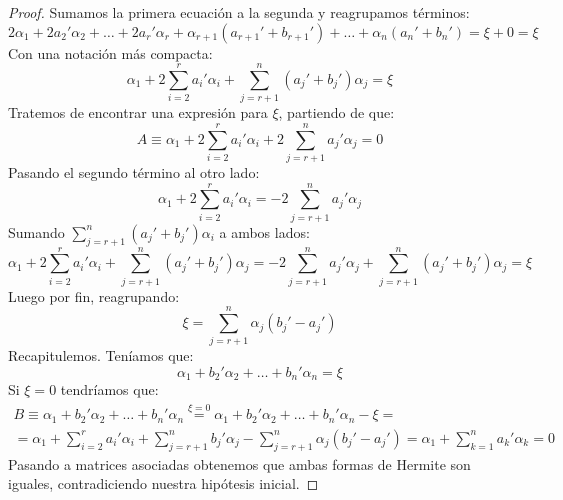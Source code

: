 \begin{proof}
	Sumamos la primera ecuación a la segunda y reagrupamos términos:
	\[2\alpha_1+2a_2'\alpha_2+\dots+2a_r'\alpha_r+\alpha_{r+1}(a_{r+1}'+b_{r+1}')+\dots+\alpha_n(a_n'+b_n')=\xi+0=\xi\]
	Con una notación más compacta:
	\[\alpha_1+2\sum_{i=2}^{r}a_i'\alpha_i+\sum_{j=r+1}^{n}(a_j'+b_j')\alpha_j=\xi\]
	Tratemos de encontrar una expresión para $\xi$, partiendo de que:
	\[A\equiv \alpha_1+2\sum_{i=2}^{r}a_i'\alpha_i+2\sum_{j=r+1}^{n}a_j'\alpha_j=0\]
	Pasando el segundo término al otro lado:
	\[\alpha_1+2\sum_{i=2}^{r}a_i'\alpha_i=-2\sum_{j=r+1}^{n}a_j'\alpha_j\]
	Sumando $\sum_{j=r+1}^{n}(a_j'+b_j')\alpha_i$ a ambos lados:
	\[\alpha_1+2\sum_{i=2}^{r}a_i'\alpha_i+\sum_{j=r+1}^{n}(a_j'+b_j')\alpha_j=-2\sum_{j=r+1}^{n}a_j'\alpha_j+\sum_{j=r+1}^{n}(a_j'+b_j')\alpha_j=\xi\]
	Luego por fin, reagrupando:
	\[\xi=\sum_{j=r+1}^{n}\alpha_{j}(b_{j}'-a_{j}')\]
	Recapitulemos. Teníamos que:
	\[\alpha_1+b_2'\alpha_2+\dots+b_n'\alpha_n=\xi\]
	Si $\xi=0$ tendríamos que:
	\begin{multline*}B\equiv\alpha_1+b_2'\alpha_2+\dots+b_n'\alpha_n\stackrel{\xi=0}{=}\alpha_1+b_2'\alpha_2+\dots+b_n'\alpha_n-\xi=\\ =\alpha_1+\sum_{i=2}^{r}a_i'\alpha_i+\sum_{j=r+1}^{n}b_j'\alpha_j-\sum_{j=r+1}^{n}\alpha_{j}(b_{j}'-a_{j}')=\alpha_1+\sum_{k=1}^{n}a_k'\alpha_k=0\end{multline*}
	Pasando a matrices asociadas obtenemos que ambas formas de Hermite son iguales, contradiciendo nuestra hipótesis inicial.
\end{proof}